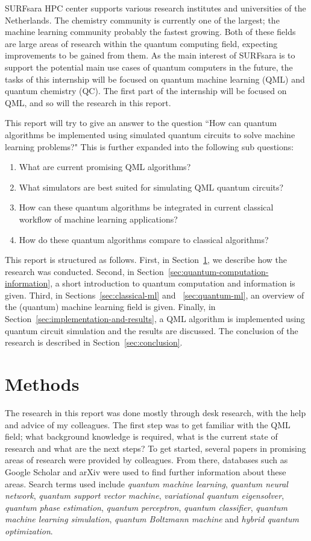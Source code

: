 \documentclass[a4paper,10pt]{article}
\begin{document}
SURFsara HPC center supports various research institutes and universities of the Netherlands.
The chemistry community is currently one of the largest; the machine learning community probably the fastest growing.
Both of these fields are large areas of research within the quantum computing field, expecting improvements to be gained from them.
As the main interest of SURFsara is to support the potential main use cases of quantum computers in the future, the tasks of this internship will be focused on quantum machine learning (QML) and quantum chemistry (QC).
The first part of the internship will be focused on QML, and so will the research in this report.

This report will try to give an answer to the question ``How can quantum algorithms be implemented using simulated quantum circuits to solve machine learning problems?"
This is further expanded into the following sub questions:
\begin{enumerate}
	\item What are current promising QML algorithms?
	\item What simulators are best suited for simulating QML quantum circuits?
	\item How can these quantum algorithms be integrated in current classical workflow of machine learning applications?
	\item How do these quantum algorithms compare to classical algorithms?
\end{enumerate}

This report is structured as follows. First, in Section~\ref{sec:methods}, we describe how the research was conducted.
Second, in Section~\ref{sec:quantum-computation-information}, a short introduction to quantum computation and information is given.
Third, in Sections~\ref{sec:classical-ml} and ~\ref{sec:quantum-ml}, an overview of the (quantum) machine learning field is given.
Finally, in Section~\ref{sec:implementation-and-results}, a QML algorithm is implemented using quantum circuit simulation and the results are discussed.
The conclusion of the research is described in Section~\ref{sec:conclusion}.

\section{Methods} \label{sec:methods}
The research in this report was done mostly through desk research, with the help and advice of my colleagues.
The first step was to get familiar with the QML field; what background knowledge is required, what is the current state of research and what are the next steps?
To get started, several papers in promising areas of research were provided by colleagues. 
From there, databases such as Google Scholar and arXiv were used to find further information about these areas.
Search terms used include \emph{quantum machine learning}, \emph{quantum neural network}, \emph{quantum support vector machine}, \emph{variational quantum eigensolver}, \emph{quantum phase estimation}, \emph{quantum perceptron}, \emph{quantum classifier}, \emph{quantum machine learning simulation}, \emph{quantum Boltzmann machine} and \emph{hybrid quantum optimization}.
\end{document}
